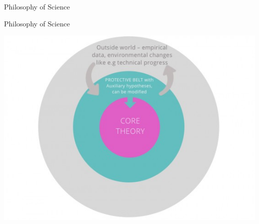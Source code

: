 \documentclass{beamer}
\begin{document}
\begin{frame}{Philosophy of Science}
\end{frame}

\begin{frame}{Philosophy of Science}
\begin{center}
	\includegraphics[width=.9\textwidth]{../images/lakatosmodel.jpg}
\end{center}
\end{frame}
\end{document}
